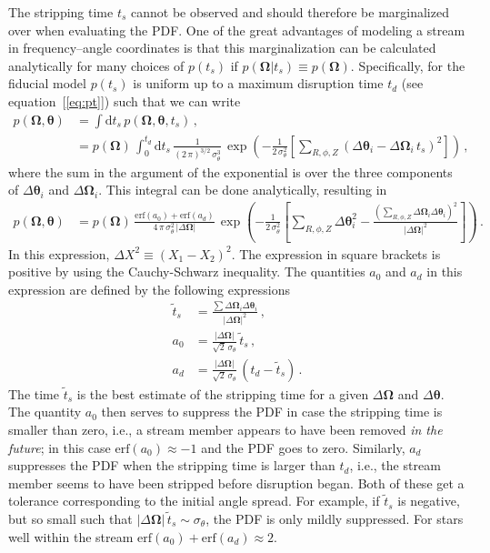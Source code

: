 \documentclass[12pt,preprint]{aastex}
\newcommand{\ie}{i.e.}
\newcommand{\dd}{\mathrm{d}}
\newcommand{\eqnname}{equation}
\newcommand{\equationname}{\eqnname}
\renewcommand{\vec}[1]{\ensuremath{\mathbf{#1}}}
\newcommand{\veco}{\ensuremath{\vec{\Omega}}}
\newcommand{\veca}{\ensuremath{\boldsymbol\theta}}
\begin{document}
The stripping time $t_s$ cannot be observed and should therefore be
marginalized over when evaluating the PDF. One of the great advantages
of modeling a stream in frequency--angle coordinates is that this
marginalization can be calculated analytically for many choices of
$p(t_s)$ if $p(\veco|t_s) \equiv p(\veco)$. Specifically, for the
fiducial model $p(t_s)$ is uniform up to a maximum disruption time
$t_d$ (see \equationname~[\ref{eq:pt}]) such that we can write
\begin{equation}
\begin{split}
  p(\veco,\veca) & = \int \dd t_s\,p(\veco,\veca,t_s)\,,\\
  & = p(\veco)\,\int_0^{t_d} \dd t_s\,
  \frac{1}{(2\,\pi)^{3/2}\,\sigma_\theta^3}\,\exp\left(-\frac{1}{2\,\sigma_\theta^2}\left[\sum_{R,\phi,Z}\left(\Delta \veca_i-\Delta \veco_i\,t_s\right)^2\right]\right)\,,
\end{split}
\end{equation}
where the sum in the argument of the exponential is over the three
components of $\Delta \veca_i$ and $\Delta \veco_i$. This integral can
be done analytically, resulting in
\begin{equation}\label{eq:pdf}
\begin{split}
  p(\veco,\veca) & = 
  p(\veco) \,  \frac{\mathrm{erf}(a_0) + \mathrm{erf}(a_d)}{4\,\pi\,\sigma_\theta^2\,|\Delta \veco|}\,\exp\left(-\frac{1}{2\,\sigma_\theta^2}\left[\sum_{R,\phi,Z}\Delta \veca^2_i-\frac{\left(\sum_{R,\phi,Z} \Delta \veco_i\Delta \veca_i\right)^2}{|\Delta \veco|^2}\right]\right)\,.
\end{split}
\end{equation}
In this expression, $\Delta X^2 \equiv (X_1-X_2)^2$. The expression in
square brackets is positive by using the Cauchy-Schwarz
inequality. The quantities $a_0$ and $a_d$ in this expression are
defined by the following expressions
\begin{align}
  \tilde{t}_s & = \frac{\sum \Delta \veco_i\Delta \veca_i}{|\Delta \veco|^2}\,,\\
  a_0 & = \frac{|\Delta \veco|}{\sqrt{2}\,\sigma_\theta}\,\tilde{t}_s\,,\\
  a_d & = \frac{|\Delta \veco|}{\sqrt{2}\,\sigma_\theta}\,\left(t_d - \tilde{t}_s\right)\,.
\end{align}
The time $\tilde{t}_s$ is the best estimate of the stripping time for
a given $\Delta \veco$ and $\Delta \veca$. The quantity $a_0$ then
serves to suppress the PDF in case the stripping time is smaller than
zero, \ie, a stream member appears to have been removed \emph{in the
  future}; in this case $\mathrm{erf}(a_0) \approx -1$ and the PDF
goes to zero. Similarly, $a_d$ suppresses the PDF when the stripping
time is larger than $t_d$, \ie, the stream member seems to have been
stripped before disruption began. Both of these get a tolerance
corresponding to the initial angle spread. For example, if
$\tilde{t}_s$ is negative, but so small such that $|\Delta
\veco|\,\tilde{t}_s \sim \sigma_\theta$, the PDF is only mildly
suppressed. For stars well within the stream $\mathrm{erf}(a_0) +
\mathrm{erf}(a_d) \approx 2$.
\end{document}
